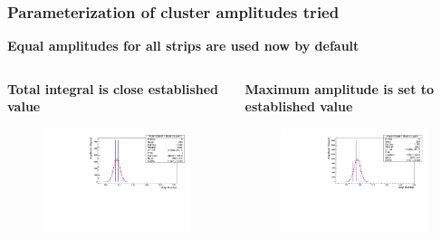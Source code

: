 \documentclass[dvipsnames] {beamer}
\begin{document}
           \begin{frame}
             \frametitle{\bf \centering Parameterization of cluster amplitudes tried}          
              \begin{block}{}
                 \bf Equal amplitudes for all strips are used now by default
               \end{block}
               \begin{columns}[t]
               \begin{block}{\bf \centering Total integral is close established value}
                 \begin{figure}[H]
                   \includegraphics[width=1.\linewidth]{gausParamOverIntegral.pdf}
                 \end{figure}
               \end{block}
               \begin{block}{\bf \centering Maximum amplitude is set to established value}
                 \begin{figure}[H]
                   \includegraphics[width=1.\linewidth]{gausParamOverMaxValue.pdf}

\end{figure}
\end{block}
\end{columns}
\end{frame}
\end{document}
